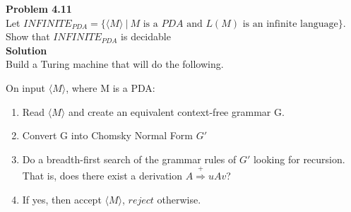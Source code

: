 \documentclass{article}
\newcommand\curl[1]{\{#1\}}
\newcommand\angl[1]{\langle #1 \rangle}}
\newcommand{\problem}[1]{\large{\textbf{Problem #1}}\\}
\begin{document}
\pagebreak

\problem{4.11}

    Let $INFINITE_{PDA} = \curl{\langle M \rangle \ |\  M \text{ is a } PDA \text{ and } L(M) \text{ is an infinite language}}$.
    Show that $INFINITE_{PDA}$ is decidable \\

    \textbf{Solution}\\

    Build a Turing machine that will do the following.

    On input $\angl{M}$, where M is a PDA:

    \begin{enumerate}[1., leftmargin = 1.5cm]
    \itemsep0em
    \item Read $\langle M \rangle$ and create an equivalent context-free grammar G.
    \item Convert G into Chomsky Normal Form  $G'$
    \item Do a breadth-first search of the grammar rules of $G'$ looking for recursion.
          That is, does there exist a derivation $A \stackrel{+}{\Rightarrow} uAv$?
    \item If yes, then accept $\langle M \rangle$, $reject$ otherwise.
    \end{enumerate}
\end{document}
